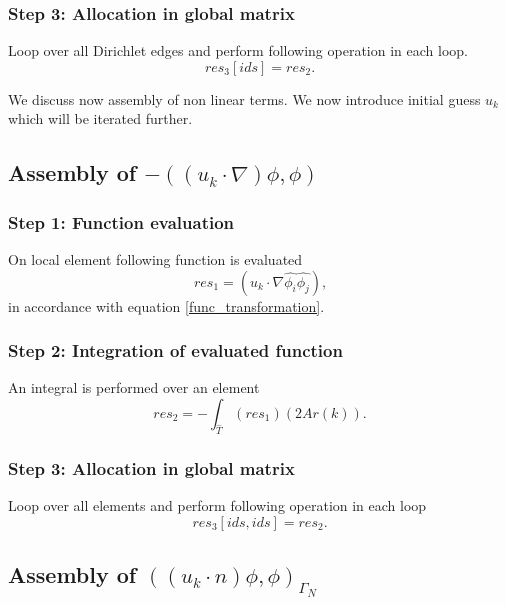 \documentclass[a4paper,twoside,openright]{book}
\begin{document}
\subsubsection{Step 3: Allocation in global matrix}

Loop over all Dirichlet edges and perform following operation in each loop. 
\begin{equation}
res_3[ids] = res_2 \textrm{.}
\end{equation}

We discuss now assembly of non linear terms. We now introduce initial guess $u_k$ which will be iterated further.\\

\subsection{Assembly of $-((u_k \cdot \nabla)\phi , \phi)$}

\subsubsection{Step 1: Function evaluation}

On local element following function is evaluated 
\begin{equation}
res_1 = (u_k \cdot \nabla \hat{\phi_i} \hat{\phi_j}) \textrm{,}
\end{equation} 
in accordance with equation \eqref{func_transformation}.\\

\subsubsection{Step 2: Integration of evaluated function}

An integral is performed over an element 
\begin{equation}
res_2= - \int_{\hat{T}} (res_1) (2Ar(k)) \textrm{.}
\end{equation}

\subsubsection{Step 3: Allocation in global matrix}

Loop over all elements and perform following operation in each loop 
\begin{equation}
res_3[ids,ids]=res_2 \textrm{.}
\end{equation}

\subsection{Assembly of $((u_k \cdot n)\phi , \phi)_{\Gamma_N}$} 
\end{document}
